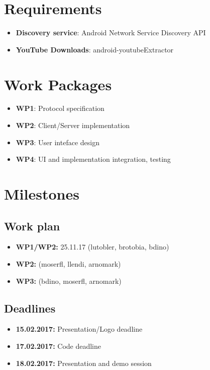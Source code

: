 \documentclass{report}
\begin{document}
\section{Requirements}
\begin{itemize}
    \item {\bf Discovery service}: Android Network Service Discovery API \cite{nsd}
    \item {\bf YouTube Downloads}: android-youtubeExtractor \cite{youtubeExtractor}
\end{itemize}

\section{Work Packages}
\begin{itemize}
    \item {\bf WP1}: Protocol specification
    \item {\bf WP2}: Client/Server implementation
    \item {\bf WP3}: User inteface design
    \item {\bf WP4}: UI and implementation integration, testing
\end{itemize}

\section{Milestones}
\subsection*{Work plan}
\begin{itemize}
    \item {\bf WP1/WP2:} 25.11.17 (lutobler, brotobia, bdino)
    \item {\bf WP2:} (moserfl, llendi, arnomark)
    \item {\bf WP3:} (bdino, moserfl, arnomark)
\end{itemize}

\subsection*{Deadlines}
\begin{itemize}
    \item {\bf 15.02.2017:} Presentation/Logo deadline
    \item {\bf 17.02.2017:} Code deadline
    \item {\bf 18.02.2017:} Presentation and demo session
\end{itemize}
\end{document}
